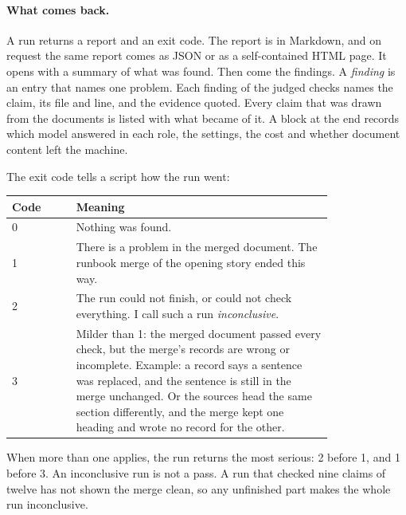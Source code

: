 \paragraph{What comes back.} A run returns a report and an exit code. The report is in Markdown, and on request the same report comes as JSON or as a self-contained HTML page. It opens with a summary of what was found. Then come the findings. A \emph{finding} is an entry that names one problem. Each finding of the judged checks names the claim, its file and line, and the evidence quoted. Every claim that was drawn from the documents is listed with what became of it. A block at the end records which model answered in each role, the settings, the cost and whether document content left the machine.

The exit code tells a script how the run went:

\begin{center}\small
\begin{tabular}{@{}lp{0.80\linewidth}@{}}
\toprule
Code & Meaning \\
\midrule
0 & Nothing was found. \\
1 & There is a problem in the merged document. The runbook merge of the opening story ended this way. \\
2 & The run could not finish, or could not check everything. I call such a run \emph{inconclusive}. \\
3 & Milder than 1: the merged document passed every check, but the merge's records are wrong or incomplete. Example: a record says a sentence was replaced, and the sentence is still in the merge unchanged. Or the sources head the same section differently, and the merge kept one heading and wrote no record for the other. \\
\bottomrule
\end{tabular}
\end{center}

\noindent When more than one applies, the run returns the most serious: 2 before 1, and 1 before 3. An inconclusive run is not a pass. A run that checked nine claims of twelve has not shown the merge clean, so any unfinished part makes the whole run inconclusive.
